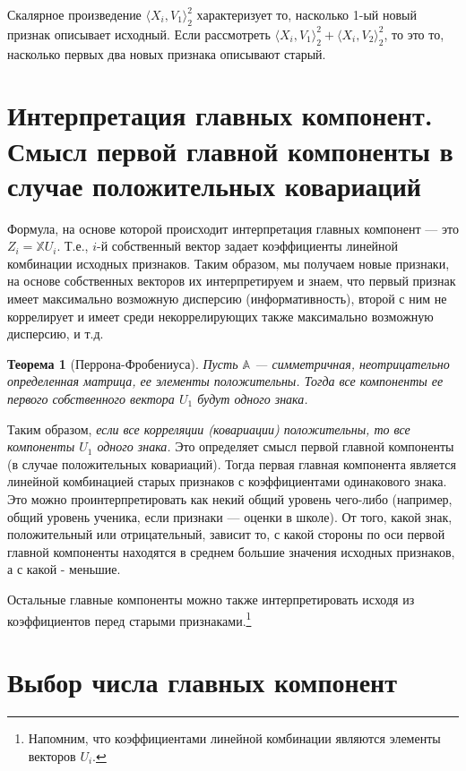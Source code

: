 \documentclass[specialist, 12pt,
subf, %
href, colorlinks=true,
substylefile = spbu.rtx,
]{disser}
\newtheorem{theorem}{Теорема}
\begin{document}
	Скалярное произведение	$\langle X_i,V_1\rangle_2^2$ характеризует то, насколько 1-ый новый признак описывает исходный. Если рассмотреть $\langle X_i,V_1\rangle_2^2 + \langle X_i,V_2\rangle_2^2$, то это то, насколько первых два новых признака описывают старый.

\section{Интерпретация главных компонент. Смысл первой главной компоненты в случае положительных ковариаций}

Формула, на основе которой происходит интерпретация главных компонент --- это $Z_i = \mathbb{X} U_i$. Т.е., $i$-й собственный вектор задает коэффициенты линейной комбинации исходных признаков. Таким образом, мы получаем новые признаки, на основе собственных векторов их интерпретируем и знаем, что первый признак имеет максимально возможную дисперсию (информативность), второй с ним не коррелирует и имеет среди некоррелирующих также максимально возможную дисперсию, и т.д.

\begin{theorem}[Перрона-Фробениуса]
	Пусть $\mathbb{A}$ --- симметричная, неотрицательно определенная матрица, ее элементы положительны. Тогда все компоненты ее первого собственного вектора $U_1$ будут одного знака.
\end{theorem}

Таким образом, \textit{если все корреляции (ковариации) положительны, то все компоненты $U_1$ одного знака.} Это определяет смысл первой главной компоненты (в случае положительных ковариаций). Тогда первая главная компонента является линейной комбинацией старых признаков с коэффициентами одинакового знака. Это можно проинтерпретировать как некий общий уровень чего-либо (например, общий уровень ученика, если признаки --- оценки в школе). От того, какой знак, положительный или отрицательный, зависит то, с какой стороны по оси первой главной компоненты находятся в среднем большие значения исходных признаков, а с какой - меньшие.

Остальные главные компоненты можно также интерпретировать исходя из коэффициентов перед старыми признаками.\footnote{Напомним, что коэффициентами линейной комбинации являются элементы векторов $U_i$.}


\section{Выбор числа главных компонент}
\end{document}
